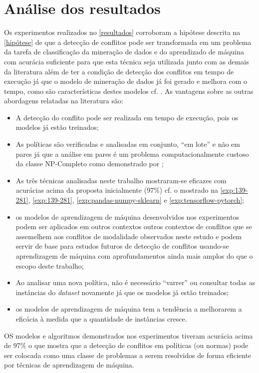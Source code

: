 \section{Análise dos resultados}\label{analise_resultados}
Os experimentos realizados no \autoref{resultados} corroboram a hipótese descrita na  \autoref{hipótese} de que a detecção de conflitos pode ser transformada em um problema da tarefa de classificação da mineração de dados e do aprendizado de máquina com acurácia suficiente para que esta técnica seja utilizada junto com as demais da literatura além de ter a condição de detecção dos conflitos em tempo de execução já que o modelo de mineração de dados já foi gerado e melhora com o tempo, como são características destes modelos cf. . As vantagens sobre as outras abordagens relatadas na literatura são:
\begin{itemize}
	\item A detecção do conflito pode ser realizada em tempo de execução, pois os modelos já estão treinados;	
	\item As políticas são verificadas e analisadas em conjunto, ``em lote'' e não em pares já que a análise em pares é um problema computacionalmente custoso da classe NP-Completo como demonstrado por ; 
	\item As três técnicas analisadas neste trabalho mostraram-se eficazes com acurácias acima da proposta inicialmente (97\%) cf. o mostrado na \autoref{exp:139-281}, \autoref{exp:139-281}, \autoref{exp:pandas-numpy-sklearn} e \autoref{exp:tensorflow-pytorch};
	\item os modelos de aprendizagem de máquina desenvolvidos nos experimentos podem ser aplicados em outros contextos outros contextos de conflitos que se assemelhem aos conflitos de modalidade  observados neste estudo e podem servir de base para estudos futuros de detecção de conflitos usando-se aprendizagem de máquina com aprofundamentos ainda mais amplos do que o escopo deste trabalho;
	\item Ao analisar uma nova política, não é necessário ``varrer'' ou consultar todas as instâncias do \textit{dataset} novamente já que os modelos já estão treinados;
	\item os modelos de aprendizagem de máquina tem a tendência a melhorarem a eficácia à medida que a quantidade de instâncias cresce.
\end{itemize}

OS modelos e algoritmos demonstrados nos experimentos tiveram acurácia acima de 97\% o que mostra que a detecção de conflitos em políticas (ou normas) pode ser colocada como uma classe de problemas a serem resolvidos de forma eficiente por técnicas de aprendizagem de máquina.

